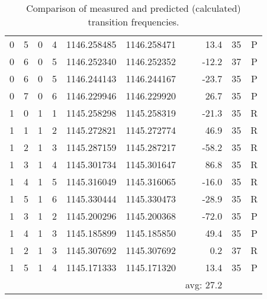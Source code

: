 \begin{table}
\begin{tabu}{rrrrrrrrr}
\rowfont{\color{blue}}0 & 5 & 0 & 4 & 1146.258485 & 1146.258471 & 13.4 & 35 & P\\
\rowfont{\color{blue}}0 & 6 & 0 & 5 & 1146.252340 & 1146.252352 & -12.2 & 37 & P\\
\rowfont{\color{blue}}0 & 6 & 0 & 5 & 1146.244143 & 1146.244167 & -23.7 & 35 & P\\
\rowfont{\color{blue}}0 & 7 & 0 & 6 & 1146.229946 & 1146.229920 & 26.7 & 35 & P\\
\rowfont{\color{red}}1 & 0 & 1 & 1 & 1145.258298 & 1145.258319 & -21.3 & 35 & R\\
\rowfont{\color{red}}1 & 1 & 1 & 2 & 1145.272821 & 1145.272774 & 46.9 & 35 & R\\
\rowfont{\color{red}}1 & 2 & 1 & 3 & 1145.287159 & 1145.287217 & -58.2 & 35 & R\\
\rowfont{\color{red}}1 & 3 & 1 & 4 & 1145.301734 & 1145.301647 & 86.8 & 35 & R\\
\rowfont{\color{red}}1 & 4 & 1 & 5 & 1145.316049 & 1145.316065 & -16.0 & 35 & R\\
\rowfont{\color{red}}1 & 5 & 1 & 6 & 1145.330444 & 1145.330473 & -28.9 & 35 & R\\
\rowfont{\color{blue}}1 & 3 & 1 & 2 & 1145.200296 & 1145.200368 & -72.0 & 35 & P\\
\rowfont{\color{blue}}1 & 4 & 1 & 3 & 1145.185899 & 1145.185850 & 49.4 & 35 & P\\
\rowfont{\color{red}}1 & 2 & 1 & 3 & 1145.307692 & 1145.307692 & 0.2 & 37 & R\\
\rowfont{\color{blue}}1 & 5 & 1 & 4 & 1145.171333 & 1145.171320 & 13.4 & 35 & P\\
\midrule
 &  &  &  &  &  &  avg: 27.2\\
\bottomrule
\end{tabu}\caption{Comparison of measured and predicted (calculated) transition frequencies.}\end{table}

